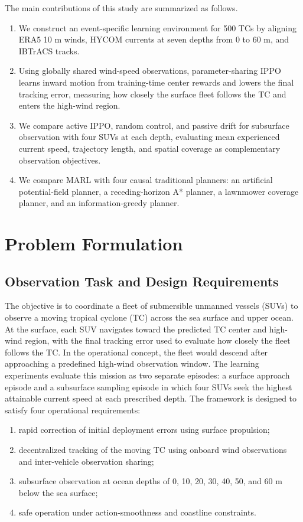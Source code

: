 \documentclass[a4paper,fleqn]{cas-dc}
\begin{document}
The main contributions of this study are summarized as follows.
\begin{enumerate}
\item We construct an event-specific learning environment for 500 TCs by
aligning ERA5 10 m winds, HYCOM currents at seven depths from 0 to 60 m, and
IBTrACS tracks.
\item Using globally shared wind-speed observations, parameter-sharing IPPO
learns inward motion from training-time center rewards and lowers the final
tracking error, measuring how closely the surface fleet follows the TC and
enters the high-wind region.
\item We compare active IPPO, random control, and passive drift for subsurface
observation with four SUVs at each depth, evaluating mean experienced current
speed, trajectory length, and spatial coverage as complementary observation
objectives.
\item We compare MARL with four causal traditional planners: an artificial
potential-field planner, a receding-horizon A* planner, a lawnmower coverage
planner, and an information-greedy planner.
\end{enumerate}

\section{Problem Formulation}\label{sec:problem}

\subsection{Observation Task and Design Requirements}

The objective is to coordinate a fleet of submersible unmanned vessels
(SUVs) to observe a moving tropical cyclone (TC) across the sea surface and
upper ocean. At the surface, each SUV navigates toward the predicted TC center
and high-wind region, with the final tracking error used to evaluate how
closely the fleet follows the TC. In the operational concept, the fleet would
descend after approaching a predefined high-wind observation window. The
learning experiments evaluate this mission as two separate episodes: a surface
approach episode and a subsurface sampling episode in which four SUVs seek the
highest attainable current speed at each prescribed depth. The framework is
designed to satisfy four operational requirements:

\begin{enumerate}
\item rapid correction of initial deployment errors using surface propulsion;
\item decentralized tracking of the moving TC using onboard wind observations
and inter-vehicle observation sharing;
\item subsurface observation at ocean depths of 0, 10, 20, 30, 40, 50, and
60 m below the sea surface;
\item safe operation under action-smoothness and coastline constraints.
\end{enumerate}
\end{document}
